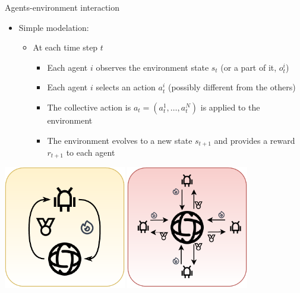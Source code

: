 \documentclass[presentation, 8pt]{beamer}\mode<presentation>{\usetheme{AMSBolognaFC}}
\begin{document}
\begin{frame}{Agents-environment interaction}
\begin{itemize}
	\item Simple modelation:
	\begin{itemize}
		\item At each time step $t$
		\begin{itemize}
			\item Each agent $i$ observes the environment state $s_t$ (or a part of it, $o_t^i$)
			\item Each agent $i$ selects an action $a_t^i$ (possibly different from the others)
			\item The collective action is $a_t = (a_t^1, \dots, a_t^N)$ is applied to the environment
			\item The environment evolves to a new state $s_{t+1}$ and provides a reward $r_{t+1}$ to each agent
		\end{itemize}
	\end{itemize}
\end{itemize}
\centering
\includegraphics[width=0.4\textwidth]{img/single-agent-multi-agent-1.pdf}
\includegraphics[width=0.4\textwidth]{img/single-agent-multi-agent-2.pdf}
\end{frame}
\end{document}
